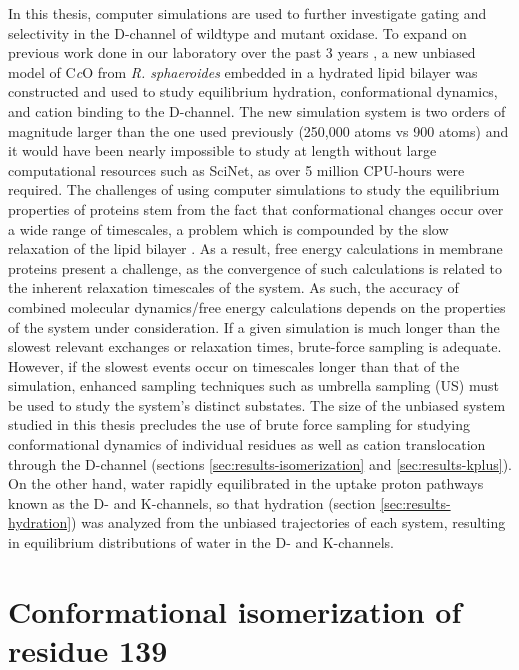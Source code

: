 In this thesis, computer simulations are used to further investigate gating and selectivity in the D-channel of wildtype and mutant oxidase. To expand on previous work done in our laboratory over the past 3 years \cite{Henry:2009p4543,Henry:2011p10221}, a new unbiased model of C\emph{c}O from \emph{R. sphaeroides} \cite{SvenssonEk:2002p5595} embedded in a hydrated lipid bilayer was constructed and used to study equilibrium hydration, conformational dynamics, and cation binding to the D-channel. The new simulation system is two orders of magnitude larger than the one used previously (250,000 atoms vs 900 atoms) and it would have been nearly impossible to study at length without large computational resources such as SciNet, as over 5 million CPU-hours were required. The challenges of using computer simulations to study the equilibrium properties of proteins stem from the fact that conformational changes occur over a wide range of timescales, a problem which is compounded by the slow relaxation of the lipid bilayer \cite{Neale:2011p2011712}. As a result, free energy calculations in membrane proteins present a challenge, as the convergence of such calculations is related to the inherent relaxation timescales of the system. As such, the accuracy of combined molecular dynamics/free energy calculations depends on the properties of the system under consideration. If a given simulation is much longer than the slowest relevant exchanges or relaxation times, brute-force sampling is adequate. However, if the slowest events occur on timescales longer than that of the simulation, enhanced sampling techniques such as umbrella sampling (US) must be used to study the system's distinct substates. The size of the unbiased system studied in this thesis precludes the use of brute force sampling for studying conformational dynamics of individual residues as well as cation translocation through the D-channel (sections \ref{sec:results-isomerization} and \ref{sec:results-kplus}). On the other hand, water rapidly equilibrated in the uptake proton pathways known as the D- and K-channels, so that hydration (section \ref{sec:results-hydration}) was analyzed from the unbiased trajectories of each system, resulting in equilibrium distributions of water in the D- and K-channels.

\section{Conformational isomerization of residue 139}

